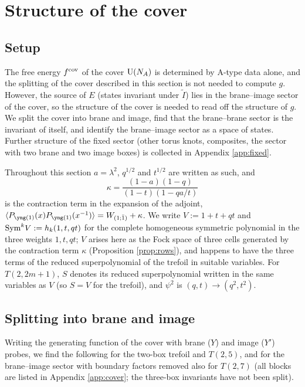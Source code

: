 \section{Structure of the cover}\label{sec:cover}

\subsection{Setup}\label{sec:cover-setup}
The free energy $f^{\mathrm{cov}}$ of the cover $\mathrm{U}(N_A)$ is determined by A-type data alone, and the splitting of the cover described in this section is not needed to compute $g$. However, the source of $E$ (states invariant under $\tilde I$) lies in the brane--image sector of the cover, so the structure of the cover is needed to read off the structure of $g$. We split the cover into brane and image, find that the brane--brane sector is the invariant of \cite{KN17} itself, and identify the brane--image sector as a space of states. Further structure of the fixed sector (other torus knots, composites, the sector with two brane and two image boxes) is collected in Appendix \ref{app:fixed}.

Throughout this section $a = \lambda^2$, $q^{1/2}$ and $t^{1/2}$ are written as such, and
\begin{equation}\label{eq:kappa}
\kappa = \frac{(1 - a)(1 - q)}{(1 - t)(1 - qa/t)}
\end{equation}
is the contraction term in the expansion of the adjoint, $\langle P_{\yone}(x)P_{\yone}(x^{-1})\rangle = W_{(1;\bar1)} + \kappa$. We write $V := 1 + t + qt$ and $\mathrm{Sym}^kV := h_k(1, t, qt)$ for the complete homogeneous symmetric polynomial in the three weights $1, t, qt$; $V$ arises here as the Fock space of three cells generated by the contraction term $\kappa$ (Proposition \ref{prop:rows}), and happens to have the three terms of the reduced superpolynomial of the trefoil in suitable variables. For $T(2,2m+1)$, $S$ denotes its reduced superpolynomial written in the same variables as $V$ (so $S = V$ for the trefoil), and $\psi^2$ is $(q, t) \to (q^2, t^2)$.

\subsection{Splitting into brane and image}\label{sec:split}
Writing the generating function of the cover with brane ($Y$) and image ($Y'$) probes, we find the following for the two-box trefoil and $T(2,5)$, and for the brane--image sector with boundary factors removed also for $T(2,7)$ (all blocks are listed in Appendix \ref{app:cover}; the three-box invariants have not been split).

